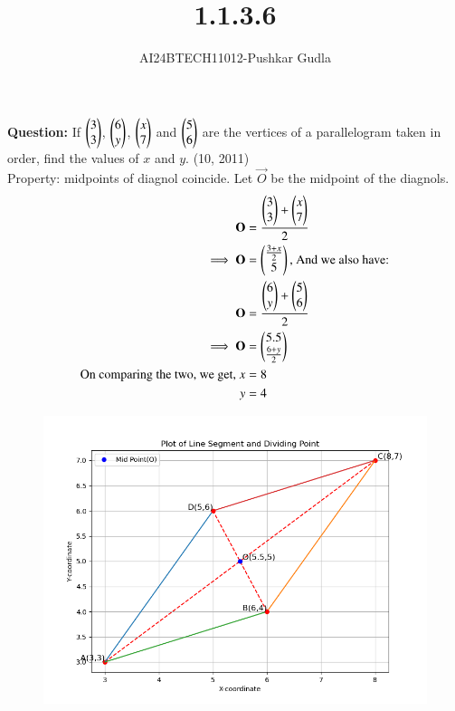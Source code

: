 \documentclass[journal]{IEEEtran}
\begin{document}

\vspace{3cm}
\title{1.1.3.6}
\author{AI24BTECH11012-Pushkar Gudla}
{\let\newpage\relax\maketitle}

\renewcommand{\thefigure}{\theenumi}
\renewcommand{\thetable}{\theenumi}
\setlength{\intextsep}{10pt} %


\renewcommand{\thetable}{\theenumi}

\textbf{Question:} If $\begin{pmatrix}3\\3\end{pmatrix}$, $\begin{pmatrix}6\\y\end{pmatrix}$, $\begin{pmatrix}x\\7\end{pmatrix}$ and $\begin{pmatrix}5\\6\end{pmatrix}$ are the vertices of a parallelogram taken in order, find the values of $x$ and $y$. 
		\hfill{(10, 2011)}\\

		\solution Property: midpoints of diagnol coincide. Let $\vec{O}$ be the midpoint of the diagnols. \\
		\begin{align}
			\mathbf{O} &=\frac{\begin{pmatrix}3\\3\end{pmatrix}+\begin{pmatrix}x\\7\end{pmatrix}}{2}\\
			\implies \mathbf{O} &= \begin{pmatrix}\frac{3+x}{2}\\5\end{pmatrix}
			\text{, And we also have:}\\
			\mathbf{O} &= \frac{\begin{pmatrix}6\\y\end{pmatrix}+\begin{pmatrix}5\\6\end{pmatrix}}{2}\\
		\implies	\mathbf{O} &= \begin{pmatrix}5.5\\\frac{6+y}{2}\end{pmatrix}\\
			\text{On comparing the two, we get, }
			x &= 8\\
			y &= 4
		\end{align}

\begin{figure}[H]
	\centering
	\includegraphics[scale=0.4]{figs/parallelogram.png}
	\label{Fig}
\end{figure}
\end{document}
